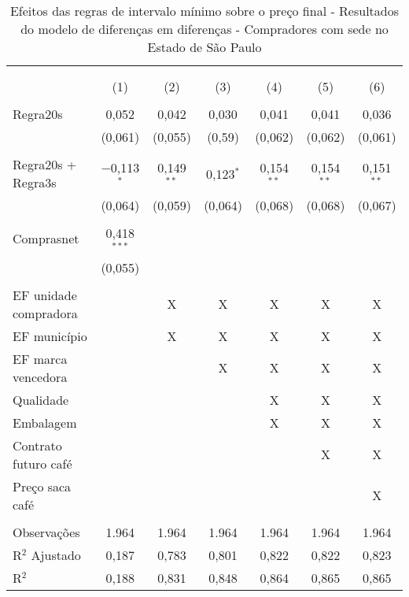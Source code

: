 
\setlength{\tabcolsep}{3pt}
\begin{table}[!htbp]
\centering
\begin{threeparttable}
\centering 
  \caption{Efeitos das regras de intervalo mínimo sobre o preço final - Resultados do modelo de diferenças em diferenças - Compradores com sede no Estado de São Paulo} 
  \label{dd_results_win_bid_sp} 
\begin{tabular}{lcccccc} 
\\[-1.8ex]\hline 
\hline \\[-1.8ex] 
\\[-1.8ex] & (1) & (2) & (3) & (4) & (5) & (6)\\ 
\hline \\[-1.8ex] 

 Regra20s & 0,052 & 0,042 & 0,030 & 0,041 & 0,041 & 0,036 \\ 
  & (0,061) & (0,055) & (0,59) & (0,062) & (0,062) & (0,061) \\ 
  & & & & & & \\ 
 Regra20s + Regra3s & $-$0,113$^{*}$ & 0,149$^{**}$ & 0,123$^{*}$ & 0,154$^{**}$ & 0,154$^{**}$ & 0,151$^{**}$ \\ 
  & (0,064) & (0,059) & (0,064) & (0,068) & (0,068) & (0,067) \\ 
  & & & & & & \\ 
 
 Comprasnet & 0,418$^{***}$ &  &  &  &  & \\ 
  & (0,055) &  &  &  &  &  \\ 
  & & & & & & \\ 

 EF unidade compradora & & X & X & X & X & X \\ 
 EF município & & X & X & X & X & X \\ 
 EF marca vencedora & & & X & X & X & X \\ 
 Qualidade & & & & X & X & X \\ 
 Embalagem & & & & X & X & X \\ 
 Contrato futuro café &  &  &  &  & X & X \\ 
 Preço saca café & & & & & & X \\ 
\hline \\[-1.8ex] 

Observações & 1.964 & 1.964 & 1.964 & 1.964 & 1.964 & 1.964 \\ 
R$^{2}$ Ajustado & 0,187 & 0,783 & 0,801 & 0,822 & 0,822 & 0,823 \\ 
R$^{2}$ & 0,188 & 0,831 & 0,848 & 0,864 & 0,865 & 0,865 \\ 
\hline 


\end{tabular}
\end{threeparttable}
\end{table}
